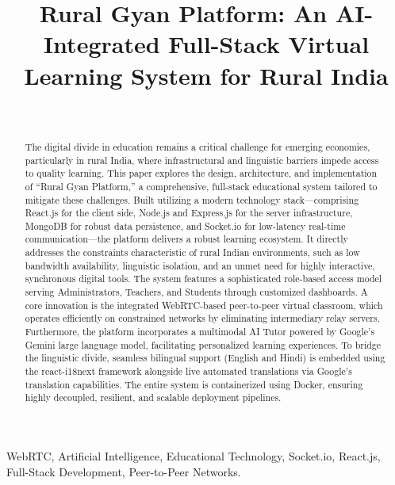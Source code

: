 \documentclass[12pt, journal, onecolumn]{IEEEtran}
\begin{document}
\title{Rural Gyan Platform: An AI-Integrated Full-Stack Virtual Learning System for Rural India}

\author{
     \\
}

\maketitle

\begin{abstract}
The digital divide in education remains a critical challenge for emerging economies, particularly in rural India, where infrastructural and linguistic barriers impede access to quality learning. This paper explores the design, architecture, and implementation of ``Rural Gyan Platform,'' a comprehensive, full-stack educational system tailored to mitigate these challenges. Built utilizing a modern technology stack—comprising React.js for the client side, Node.js and Express.js for the server infrastructure, MongoDB for robust data persistence, and Socket.io for low-latency real-time communication—the platform delivers a robust learning ecosystem. It directly addresses the constraints characteristic of rural Indian environments, such as low bandwidth availability, linguistic isolation, and an unmet need for highly interactive, synchronous digital tools. The system features a sophisticated role-based access model serving Administrators, Teachers, and Students through customized dashboards. A core innovation is the integrated WebRTC-based peer-to-peer virtual classroom, which operates efficiently on constrained networks by eliminating intermediary relay servers. Furthermore, the platform incorporates a multimodal AI Tutor powered by Google's Gemini large language model, facilitating personalized learning experiences. To bridge the linguistic divide, seamless bilingual support (English and Hindi) is embedded using the react-i18next framework alongside live automated translations via Google's translation capabilities. The entire system is containerized using Docker, ensuring highly decoupled, resilient, and scalable deployment pipelines.
\end{abstract}

\begin{IEEEkeywords}
WebRTC, Artificial Intelligence, Educational Technology, Socket.io, React.js, Full-Stack Development, Peer-to-Peer Networks.
\end{IEEEkeywords}
\end{document}

